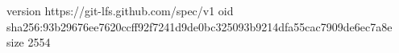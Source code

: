 version https://git-lfs.github.com/spec/v1
oid sha256:93b29676ee7620ccff92f7241d9de0bc325093b9214dfa55cac7909de6ec7a8e
size 2554
